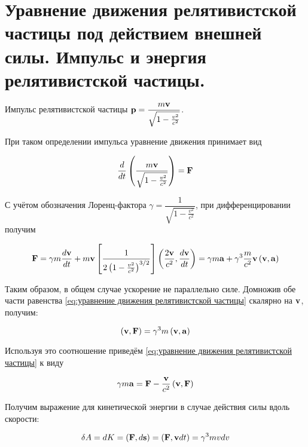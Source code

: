 \section{Уравнение движения релятивистской частицы под действием внешней силы. Импульс и энергия релятивистской частицы.}

\begin{definition}
    Импульс релятивистской частицы $\mathbf p = \dfrac{m \mathbf v}{\sqrt{1 - \frac{v^2}{c^2}}}$.
\end{definition}

При таком определении импульса уравнение движения принимает вид

\begin{equation} 
    \frac{d}{dt} \left( \frac{m \mathbf v}{\sqrt{1 - \frac{v^2}{c^2}}} \right) = \mathbf F
\end{equation}

\noindent
С учётом обозначения Лоренц-фактора $\gamma = \dfrac{1}{\sqrt{1 - \frac{v^2}{c^2}}}$, при дифференцировании получим

\begin{equation} \label{eq:уравнение движения релятивистской частицы}
    \mathbf F = \gamma m \frac{d \mathbf v}{dt} + m \mathbf v \left[ \frac{1}{2 \left( 1 - \frac{v^2}{c^2} \right)^{3/2}} \right] \left( \frac{2 \mathbf v}{c^2},  \frac{d \mathbf v}{dt} \right) = \gamma m \mathbf a + \gamma^3 \frac{m}{c^2} \mathbf v \left( \mathbf v, \mathbf a \right)
\end{equation}

\noindent
Таким образом, в общем случае ускорение не параллельно силе. Домножив обе части равенства \eqref{eq:уравнение движения релятивистской частицы} скалярно на $\mathbf v$, получим:

\begin{equation*}
    \left( \mathbf v, \mathbf F \right) = \gamma^3 m \left( \mathbf v, \mathbf a \right)
\end{equation*}

\noindent
Используя это соотношение приведём \eqref{eq:уравнение движения релятивистской частицы} к виду 

\begin{equation}
    \gamma m \mathbf a = \mathbf F - \frac{\mathbf v}{c^2} \left( \mathbf v, \mathbf F  \right)
\end{equation}

Получим выражение для кинетической энергии в случае действия силы вдоль скорости:

\begin{equation}
    \delta A = d K = \left( \mathbf F, d \mathbf s \right) = \left( \mathbf F, \mathbf v dt \right) = \gamma^3 m v dv
\end{equation}

